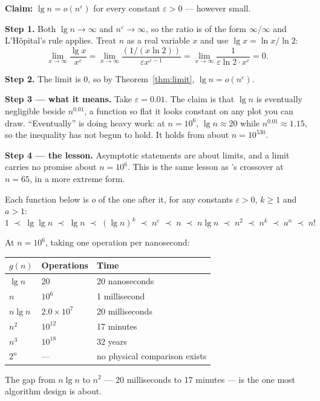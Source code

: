 \begin{worked}
\textbf{Claim:} $\lg n = o(n^{\varepsilon})$ for every constant
$\varepsilon > 0$ --- however small.

\smallskip
\textbf{Step 1.} Both $\lg n \to \infty$ and $n^{\varepsilon} \to \infty$, so
the ratio is of the form $\infty/\infty$ and L'H\^opital's rule applies.
Treat $n$ as a real variable $x$ and use $\lg x = \ln x / \ln 2$:
\[ \lim_{x\to\infty} \frac{\lg x}{x^{\varepsilon}}
   = \lim_{x\to\infty} \frac{(1/(x \ln 2))}{\varepsilon x^{\varepsilon - 1}}
   = \lim_{x\to\infty} \frac{1}{\varepsilon \ln 2 \cdot x^{\varepsilon}}
   = 0. \]

\smallskip
\textbf{Step 2.} The limit is $0$, so by Theorem~\ref{thm:limit},
$\lg n = o(n^{\varepsilon})$.

\smallskip
\textbf{Step 3 --- what it means.} Take $\varepsilon = 0.01$. The claim is that
$\lg n$ is eventually negligible beside $n^{0.01}$, a function so flat it looks
constant on any plot you can draw. ``Eventually'' is doing heavy work: at
$n = 10^{6}$, $\lg n \approx 20$ while $n^{0.01} \approx 1.15$, so the
inequality has not begun to hold. It holds from about $n = 10^{530}$.

\smallskip
\textbf{Step 4 --- the lesson.} Asymptotic statements are about limits, and a
limit carries no promise about $n = 10^{6}$. This is the same lesson as
's crossover at $n = 65$, in a more extreme form.
\end{worked}

\begin{conceptbox}
Each function below is $o$ of the one after it, for any constants
$\varepsilon > 0$, $k \ge 1$ and $a > 1$:
\[ 1 \;\prec\; \lg\lg n \;\prec\; \lg n \;\prec\; (\lg n)^{k}
    \;\prec\; n^{\varepsilon} \;\prec\; n \;\prec\; n \lg n
    \;\prec\; n^{2} \;\prec\; n^{k} \;\prec\; a^{n} \;\prec\; n! \]

\smallskip
At $n = 10^{6}$, taking one operation per nanosecond:

\begin{longtable}{@{}L{3.0cm}L{4.4cm}L{6.9cm}@{}}
\toprule
{}
\textbf{$g(n)$} & \textbf{Operations} & \textbf{Time} \\
\midrule
\endhead
$\lg n$       & 20                  & 20 nanoseconds \\
$n$           & $10^{6}$            & 1 millisecond \\
$n \lg n$     & $2.0 \times 10^{7}$ & 20 milliseconds \\
$n^{2}$       & $10^{12}$           & 17 minutes \\
$n^{3}$       & $10^{18}$           & 32 years \\
$2^{n}$       & ---                 & no physical comparison exists \\
\bottomrule
\end{longtable}

\smallskip
The gap from $n\lg n$ to $n^{2}$ --- 20 milliseconds to 17 minutes --- is the
one most algorithm design is about.
\end{conceptbox}

